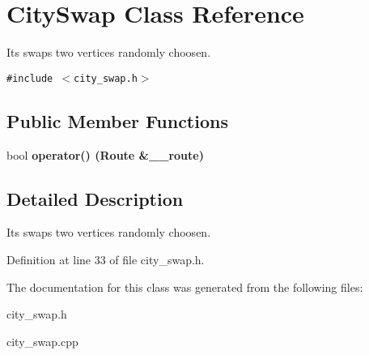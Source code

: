 \section{City\-Swap Class Reference}
\label{class_city_swap}
Its swaps two vertices randomly choosen.  


{\tt \#include $<$city\_\-swap.h$>$}

\subsection*{Public Member Functions}
\begin{CompactItemize}
\item 
bool \bf{operator()} (Route \&\_\-\_\-route)\label{class_city_swap_7e6958b62048c89604cbf046b86bdf2d}

\end{CompactItemize}


\subsection{Detailed Description}
Its swaps two vertices randomly choosen. 



Definition at line 33 of file city\_\-swap.h.

The documentation for this class was generated from the following files:\begin{CompactItemize}
\item 
city\_\-swap.h\item 
city\_\-swap.cpp\end{CompactItemize}
